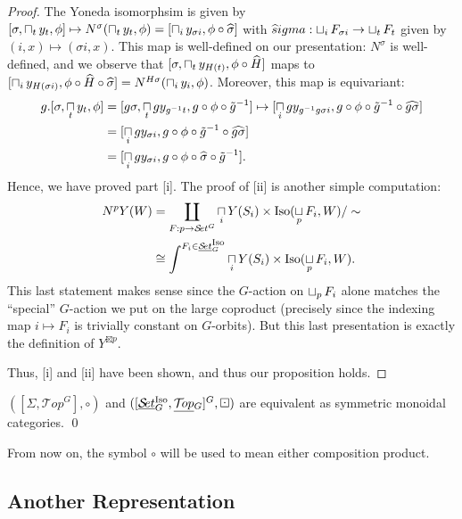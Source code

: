 \documentclass{report}
\newcommand{\Top}{\text{$\mathcal{T}\!op$}}
\newcommand{\Set}{\text{$\mathcal{S}\!et$}}
\DeclareMathOperator{\Iso}{Iso}
\newcommand{\TopG}{\text{\underline{$\Top$}$_G$}}
\newcommand{\SetG}{\text{\underline{$\Set$}$_G^{\mbox{\scriptsize Iso}}$}}
\renewcommand{\ST}{\text{$[\SetG,\TopG]^G$}}
\newcommand{\icap}{\operatornamewithlimits{\sqcap}}
\newcommand{\ico}{\operatornamewithlimits{\sqcup}}
\renewcommand{\hat}[1]{\text{$\widehat{#1}$}}
\begin{document}
\begin{proof}
  The Yoneda isomorphsim is given by $[\sigma,\icap_ty_t,\phi]\mapsto N^\sigma(\icap_ty_t,\phi) = [\icap_iy_{\sigma i},\phi\circ \hat \sigma]$ with $\hat sigma: \ico_iF_{\sigma i}\to \ico_tF_t$ given by $(i,x)\mapsto (\sigma i, x)$. This map is well-defined on our presentation: $N^\sigma$ is well-defined, and we observe that $[\sigma,\icap_ty_{H(t)},\phi\circ \hat H]$ maps to $[\icap_iy_{H(\sigma i)},\phi \circ \hat H \circ \hat \sigma] = N^{H\sigma}(\icap_iy_i,\phi)$. Moreover, this map is equivariant:
  \begin{align*}
    g.[\sigma,\icap_ty_t,\phi] &= [g\sigma,\icap_tgy_{g^{-1}t},g\circ\phi\circ\tilde g^{-1}] \mapsto [\icap_igy_{g^{-1}g\sigma i},g\circ\phi\circ \tilde g^{-1}\circ \hat{g\sigma}]\\
    &= [\icap_igy_{\sigma i},g\circ\phi\circ\tilde g^{-1}\circ\hat{g\sigma}]\\
    &= [\icap_igy_{\sigma i},g\circ\phi\circ\hat\sigma\circ\tilde g^{-1}].
  \end{align*}
  Hence, we have proved part [i]. The proof of [ii] is another simple computation:
  \begin{align*}
    N^pY(W) &= \coprod_{F: p\to \Set^G}\icap_iY(S_i) \times \Iso(\ico_pF_i,W)/\sim\\
    &\cong \int^{F_i\in \SetG}\icap_iY(S_i)\times \Iso(\ico_pF_i,W).
  \end{align*}
  This last statement makes sense since the $G$-action on $\ico_pF_i$ alone matches the ``special'' $G$-action we put on the large coproduct (precisely since the indexing map $i\mapsto F_i$ is trivially constant on $G$-orbits). But this last presentation is exactly the definition of $Y^{\boxtimes p}$. 

  Thus, [i] and [ii] have been shown, and thus our proposition holds.
\end{proof}

\begin{theorem}
  $([\Sigma,\Top^G],\circ)$ and $(\ST,\boxdot)$ are equivalent as symmetric monoidal categories. \qed
\end{theorem}

\begin{remark}
  From now on, the symbol $\circ$ will be used to mean either composition product. 
\end{remark}


\subsection{Another Representation}
\end{document}

